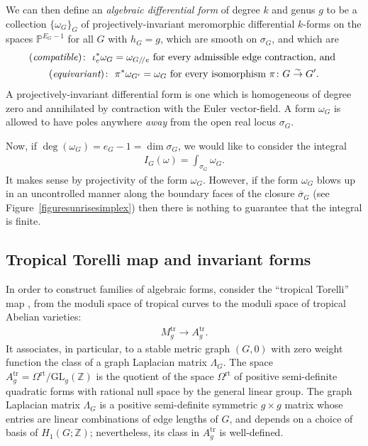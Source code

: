 \documentclass[pdftex]{sigma}%
\numberwithin{equation}{section}
\newcommand{\To}{\longrightarrow}
\newcommand{\Z}{\mathbb Z}
\newcommand{\Pro}{\mathbb P}
\newcommand{\q}{/\!/}
\newcommand{\tr}{\mathrm{tr}}
\newcommand{\GL}{\mathrm{GL}}
\newcommand{\0}{\color{blue}{\mathsf{0}}}
\begin{document}
 We can then define an \emph{algebraic differential form} of degree $k$ and genus $g$ to be a collection $\{\omega_G\}_G$
 of projectively-invariant meromorphic differential $k$-forms on the
 spaces $\Pro^{E_G-1}$ for all $G$ with $h_G=g$, which are smooth on $\sigma_G$, and which are
 \begin{gather}
({\it compatible})\colon\ \iota_e^* \omega_G = \omega_{G\q e} \text{ for every admissible edge contraction, and } \nonumber
\\
 (\text{\it equivariant})\colon\ \pi^* \omega_{G'} = \omega_{G} \text{ for every isomorphism } \pi\colon G \overset{\sim}{\rightarrow} G'.\label{CompatibleEquivariant}
 \end{gather}
 A projectively-invariant differential form is one which is homogeneous of degree zero and annihilated by contraction with the Euler vector-field.
 A form $\omega_G$ is allowed to have poles anywhere \emph{away} from the open real locus $\sigma_G$.

Now, if $\deg (\omega_G) = e_G-1= \dim \sigma_{G}$, we would like to consider the integral
 \begin{gather*}
 I_G (\omega) = \int_{\sigma_G} \omega_G .
 \end{gather*}
 It makes sense by projectivity of the form $\omega_G$.
However, if the form $\omega_G$ blows up in an uncontrolled manner along the boundary faces of the closure $\overline{\sigma}_G$ (see Figure~\ref{figuresunrisesimplex}) then there is nothing to guarantee that the integral is finite.

\subsection{Tropical Torelli map and invariant forms} In order to construct families of algebraic forms, consider the ``tropical Torelli'' map \cite{Baker, CaporasoViviani, ChanTorelli, Nagnibeda},
 from the moduli space of tropical curves to the moduli space of tropical Abelian varieties:
 \begin{gather} \label{Intro: TropTorelli}
 M_g^{\tr} \To A_g^{\tr}.
 \end{gather}
 It associates, in particular, to a stable metric graph $(G,0)$ with zero weight function the class of a graph Laplacian matrix $\Lambda_G$.
 The space $A_g^{\tr} = \Omega^{\mathrm{rt}}/\GL_g(\Z)$ is the quotient of the space $\Omega^{\mathrm{rt}}$ of positive semi-definite quadratic forms with rational null space by the general linear group. The graph Laplacian matrix $\Lambda_G$ is a positive semi-definite symmetric $g\times g$ matrix whose entries are linear combinations of edge lengths of $G$, and depends on a choice of basis of $H_1(G;\Z)$; nevertheless, its class in $A_g^{\tr}$ is well-defined.
\end{document}
